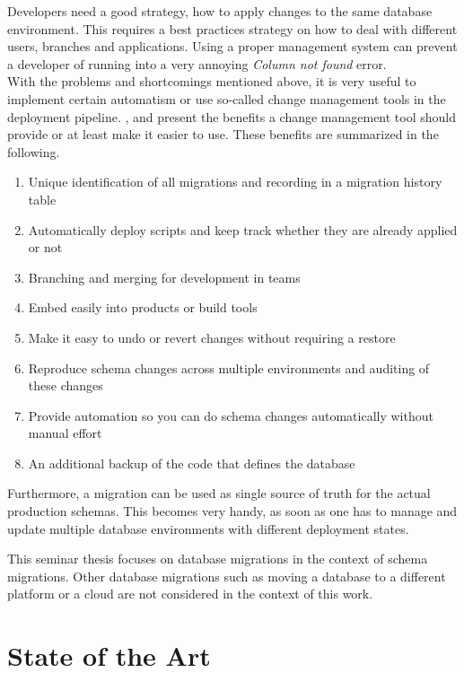 Developers need a good strategy, how to apply changes to the same database environment.
This requires a best practices strategy on how to deal with different users, branches and applications. Using a proper management system can prevent a developer of running into a very annoying \textit{Column not found} error.\\

 
%
With the problems and shortcomings mentioned above, it is very useful to implement certain automatism or use so-called change management tools in the deployment pipeline.
\cite{Dillon2022}, \cite{Robles2021} and \cite{Fritchey2022} present the benefits a change management tool should provide or at least make it easier to use. These benefits are summarized in the following.

\begin{enumerate}
	\item Unique identification of all migrations and recording in a migration history table
    \item Automatically deploy scripts and keep track whether they are already applied or not
    \item Branching and merging for development in teams
    \item Embed easily into products or build tools
    \item Make it easy to undo or revert changes without requiring a restore
    \item Reproduce schema changes across multiple environments and auditing of these changes
    \item Provide automation so you can do schema changes automatically without manual effort
    \item An additional backup of the code that defines the database
\end{enumerate}


Furthermore, a migration can be used as single source of truth for the actual production schemas. This becomes very handy, as soon as one has to manage and update multiple database environments with different deployment states.

%
This seminar thesis focuses on database migrations in the context of schema migrations.  Other database migrations such as moving a database to a different platform or a cloud are not considered in the context of this work.

\section{State of the Art}%
